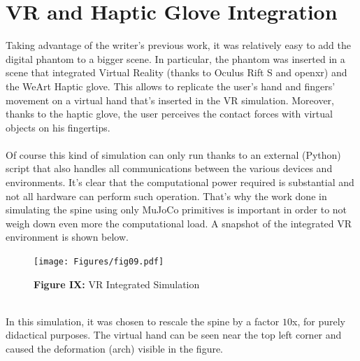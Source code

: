 \documentclass[a4paper, 12pt]{article}
\def\FigureNine{\centering\texttt{[image: Figures/fig09.pdf]}}
\begin{document}
\section{VR and Haptic Glove Integration}
Taking advantage of the writer's previous work, it was relatively easy to add the digital phantom to a bigger scene. In particular, the phantom was inserted in a scene that integrated Virtual Reality (thanks to Oculus Rift S and openxr) and the WeArt Haptic glove. This allows to replicate the user's hand and fingers' movement on a virtual hand that's inserted in the VR simulation. Moreover, thanks to the haptic glove, the user perceives the contact forces with virtual objects on his fingertips.
\\\\Of course this kind of simulation can only run thanks to an external (Python) script that also handles all communications between the various devices and environments. It's clear that the computational power required is substantial and not all hardware can perform such operation. That's why the work done in simulating the spine using only MuJoCo primitives is important in order to not weigh down even more the computational load.
A snapshot of the integrated VR environment is shown below. 
\begin{figure}[h!]
    \FigureNine
    \caption*{\textbf{Figure IX:} VR Integrated Simulation}
    \label{fig:fig09}
\end{figure}
\\In this simulation, it was chosen to rescale the spine by a factor $10$x, for purely didactical purposes. The virtual hand can be seen near the top left corner and caused the deformation (arch) visible in the figure.
\clearpage
\end{document}
